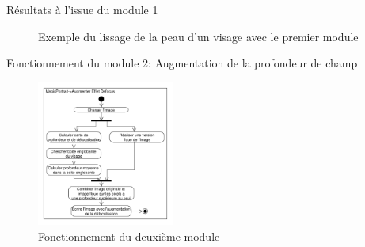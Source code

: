 \documentclass{beamer}
\begin{document}
\begin{frame}{Résultats à l'issue du module 1}
\begin{figure}[htp]
 \caption{Exemple du lissage de la peau d'un visage avec le premier module}
 \label{fig:lissageExemple}
\end{figure}
\end{frame}

\begin{frame}{Fonctionnement du module 2: Augmentation de la profondeur de champ}
\begin{figure}
\centering
\includegraphics[width=0.4\textwidth]{DiagrammeActivites_20_Profondeur}
\caption{Fonctionnement du deuxième module}
\end{figure}
\end{frame}
\end{document}
